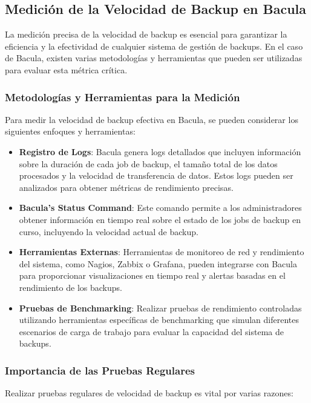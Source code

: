 \subsection{Medición de la Velocidad de Backup en Bacula}

La medición precisa de la velocidad de backup es esencial para garantizar la eficiencia y la efectividad de cualquier sistema de gestión de backups. En el caso de Bacula, existen varias metodologías y herramientas que pueden ser utilizadas para evaluar esta métrica crítica.

\subsubsection{Metodologías y Herramientas para la Medición}

Para medir la velocidad de backup efectiva en Bacula, se pueden considerar los siguientes enfoques y herramientas:

\begin{itemize}
    \item \textbf{Registro de Logs}: Bacula genera logs detallados que incluyen información sobre la duración de cada job de backup, el tamaño total de los datos procesados y la velocidad de transferencia de datos. Estos logs pueden ser analizados para obtener métricas de rendimiento precisas.
    \item \textbf{Bacula's Status Command}: Este comando permite a los administradores obtener información en tiempo real sobre el estado de los jobs de backup en curso, incluyendo la velocidad actual de backup.
    \item \textbf{Herramientas Externas}: Herramientas de monitoreo de red y rendimiento del sistema, como Nagios, Zabbix o Grafana, pueden integrarse con Bacula para proporcionar visualizaciones en tiempo real y alertas basadas en el rendimiento de los backups.
    \item \textbf{Pruebas de Benchmarking}: Realizar pruebas de rendimiento controladas utilizando herramientas específicas de benchmarking que simulan diferentes escenarios de carga de trabajo para evaluar la capacidad del sistema de backups.
\end{itemize}

\subsubsection{Importancia de las Pruebas Regulares}

Realizar pruebas regulares de velocidad de backup es vital por varias razones:

